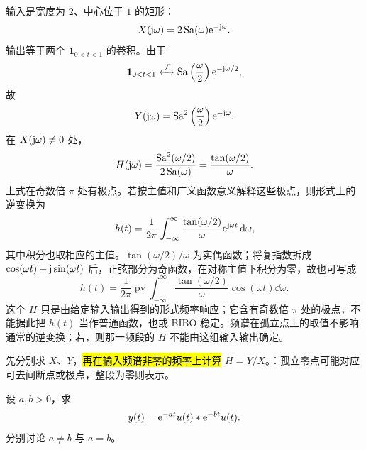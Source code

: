 \begin{solution}
  输入是宽度为 $2$、中心位于 $1$ 的矩形：
  \[
    X(\mathrm{j}\omega)=2\operatorname{Sa}(\omega)\mathrm{e}^{-\mathrm{j}\omega}.
  \]
  输出等于两个 $\mathbf 1_{0<t<1}$ 的卷积。由于
  \[
    \mathbf 1_{0<t<1}
    \mathrel{\xleftrightarrow{\,\mathcal{F}\,}}
    \operatorname{Sa}\left(\frac{\omega}{2}\right)\mathrm{e}^{-\mathrm{j}\omega/2},
  \]
  故
  \[
    Y(\mathrm{j}\omega)=\operatorname{Sa}^2\left(\frac{\omega}{2}\right)\mathrm{e}^{-\mathrm{j}\omega}.
  \]
  在 $X(\mathrm{j}\omega)\ne0$ 处，
  \begin{equation}
    H(\mathrm{j}\omega)
    =\frac{\operatorname{Sa}^2(\omega/2)}{2\operatorname{Sa}(\omega)}
    =\frac{\tan(\omega/2)}{\omega}.
    \label{eq:ex-ctft-recovered-frequency-response}
  \end{equation}
  上式在奇数倍 $\pi$ 处有极点。若按主值和广义函数意义解释这些极点，则形式上的逆变换为
  \[
    h(t)=\frac{1}{2\pi}\int_{-\infty}^{\infty}
    \frac{\tan(\omega/2)}{\omega}\mathrm{e}^{\mathrm{j}\omega t}\mathop{}\!\mathrm{d}\omega,
  \]
  其中积分也取相应的主值。$\tan(\omega/2)/\omega$ 为实偶函数；将复指数拆成 $\cos(\omega t)+\mathrm{j}\sin(\omega t)$ 后，正弦部分为奇函数，在对称主值下积分为零，故也可写成
  \[
    h(t)=\frac1{2\pi}\operatorname{pv}\int_{-\infty}^{\infty}
      \frac{\tan(\omega/2)}{\omega}\cos(\omega t)\dd\omega.
  \]
  这个 $H$ 只是由给定输入输出得到的形式频率响应；它含有奇数倍 $\pi$ 处的极点，不能据此把 $h(t)$ 当作普通函数，也或 BIBO 稳定。频谱在孤立点上的取值不影响通常的逆变换；若，则那一频段的 $H$ 不能由这组输入输出确定。
\end{solution}

\begin{technique}
  先分别求 $X$、$Y$，\hl{再在输入频谱非零的频率上计算} $H=Y/X$。：孤立零点可能对应可去间断点或极点，整段为零则表示。
\end{technique}

\begin{workedexample}[用频域乘积计算指数信号的卷积]
  \label{ex:ctft-exponential-convolution}
  设 $a,b>0$，求
  \[
    y(t)=\mathrm{e}^{-at}u(t)\mathbin{\ast}\mathrm{e}^{-bt}u(t).
  \]
  分别讨论 $a\ne b$ 与 $a=b$。
\end{workedexample}

